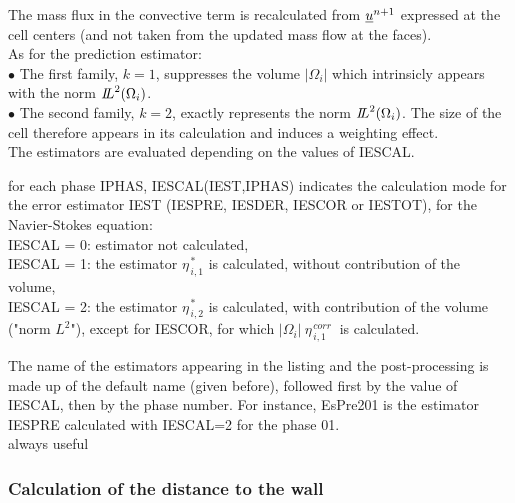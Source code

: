 The mass flux in the convective term is recalculated from $\underline{u}^{n+1}$
expressed at the cell centers (and not taken from the updated mass flow at the
faces).\\

As for the prediction estimator:\\
\hspace*{0.5cm}$\bullet$ The first family, $k=1$, suppresses the
volume $|\Omega_i|$ which intrinsicly appears  with the norm
${{I\hspace{-.25em}L}^{2}(\Omega_i)}$.\\ 
\hspace*{0.5cm}$\bullet$ The second family, $k=2$, exactly represents the norm
${{I\hspace{-.25em}L}^{2}(\Omega_i)}$. The size of the cell therefore
appears in its calculation and induces a weighting effect.\\


The estimators are evaluated depending on the values of IESCAL.
                                       

{for each phase IPHAS, IESCAL(IEST,IPHAS) indicates the calculation mode 
for the error estimator IEST (IESPRE, IESDER, IESCOR or IESTOT), for
the Navier-Stokes equation:\\ 
 IESCAL = 0: estimator not calculated, \\       
 IESCAL = 1: the estimator $ \eta^{\,* }_{\,i,1}$ is calculated,         
               without contribution of the volume, \\ 
 IESCAL = 2: the estimator $ \eta^{\,* }_{\,i,2}$ is calculated,              
               with contribution of the volume ("norm $L^2$"),              
               except for IESCOR, for which
               $|\Omega_i|\ \eta^{\,corr}_{\,i,1}\ $
               is calculated.
 
The name of the estimators appearing in the listing and the post-processing is
made up of the default name (given before), followed first by the value of
IESCAL, then by the phase number. For
instance, EsPre201 is the estimator IESPRE calculated with IESCAL=2 for
the phase 01.\\
always useful}



\subsubsection{Calculation of the distance to the wall}

